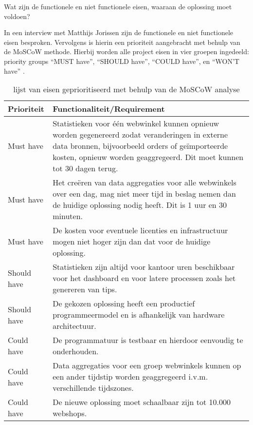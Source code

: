 
Wat zijn de functionele en niet functionele eisen, waaraan de oplossing moet voldoen?

In een interview met Matthijs Jorissen zijn de functionele en niet functionele eisen besproken. Vervolgens is hierin een prioriteit aangebracht met behulp van de MoSCoW methode. Hierbij worden alle project eisen in vier groepen ingedeeld: priority groups “MUST have”, “SHOULD have”, “COULD have”, en “WON’T have” \textcite{ma2009effectiveness}.

\begin{comment}
Een functionele eis kan gezien worden als iets dat de gebruiker nodig heeft om het doel te bereiken of een bepaalde voorwaarde waaraan de oplossing moet voldoen.

Een non functionele eis is een beperking doe wordt opgelegd op een mogelijke oplossing, met het doel om functionele eisen te behalen of het doel van het project.
\end{comment}

\begin{table}[bh]
\centering
\caption{lijst van eisen geprioritiseerd met behulp van de MoSCoW analyse}
\label{table:requirements}
\def\arraystretch{1.5}

\begin{tabular}{|l|p{12.5cm}|}
\hline
\textbf{Prioriteit} & \textbf{Functionaliteit/Requirement}
\\ \hline
Must have           & Statistieken voor één webwinkel kunnen opnieuw worden gegenereerd zodat veranderingen in externe data bronnen, bijvoorbeeld orders of geïmporteerde kosten, opnieuw worden geaggregeerd. Dit moet kunnen tot 30 dagen terug.
\\ \hline
Must have           & Het creëren van data aggregaties voor alle webwinkels over een dag, mag niet meer tijd in beslag nemen dan de huidige oplossing nodig heeft. Dit is 1 uur en 30 minuten.
\\ \hline
Must have           & De kosten voor eventuele licenties en infrastructuur mogen niet hoger zijn dan dat voor de huidige oplossing.
\\ \hline
Should have         & Statistieken zijn altijd voor kantoor uren beschikbaar voor het dashboard en voor latere processen zoals het genereren van tips.
\\ \hline
Should have         & De gekozen oplossing heeft een productief programmeermodel en is afhankelijk van hardware architectuur.
\\ \hline
Could have         & De programmatuur is testbaar en hierdoor eenvoudig te onderhouden.
\\ \hline
Could have          & Data aggregaties voor een groep webwinkels kunnen op een ander tijdstip worden geaggregeerd i.v.m. verschillende tijdszones.
\\ \hline
Could have         & De nieuwe oplossing moet schaalbaar zijn tot 10.000 webshops.
\\ \hline
\end{tabular}
\end{table}

